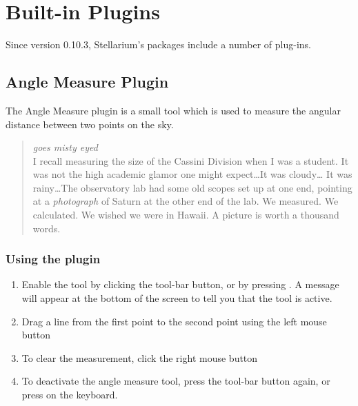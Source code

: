 
\chapter{Built-in Plugins}
Since version 0.10.3, Stellarium's packages include a number of plug-ins.

\section{Angle Measure Plugin}
\label{sec:plugins:AngleMeasure}


The Angle Measure plugin is a small tool which is used to measure the
angular distance between two points on the sky. 

\begin{quotation}\small
\noindent\emph{goes misty eyed}\\ 
I recall measuring the size of the Cassini Division when I was a student.
It was not the high academic glamor one might expect\ldots It was cloudy\ldots
It was rainy\ldots The observatory lab had some old scopes set up at one
end, pointing at a \emph{photograph} of Saturn at the other end of the
lab. We measured. We calculated. We wished we were in Hawaii. A picture
is worth a thousand words.
\end{quotation}

\subsection{Using the plugin}
\label{sec:plugins:AngleMeasure:using}

\begin{enumerate}
\item
  Enable the tool by clicking the tool-bar button, or by pressing
  . A message will appear at the bottom of the screen
  to tell you that the tool is active.
\item
  Drag a line from the first point to the second point using the left
  mouse button
\item
  To clear the measurement, click the right mouse button
\item
  To deactivate the angle measure tool, press the tool-bar button again,
  or press  on the keyboard.
\end{enumerate}

